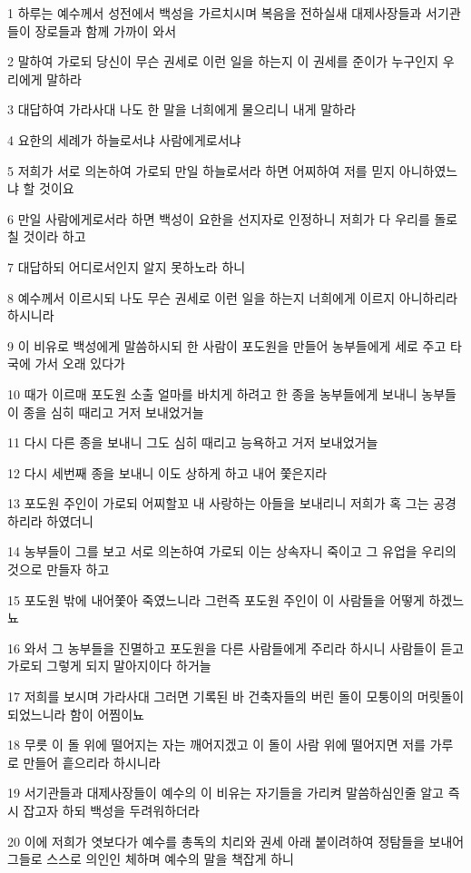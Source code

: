 \par 1 하루는 예수께서 성전에서 백성을 가르치시며 복음을 전하실새 대제사장들과 서기관들이 장로들과 함께 가까이 와서
\par 2 말하여 가로되 당신이 무슨 권세로 이런 일을 하는지 이 권세를 준이가 누구인지 우리에게 말하라
\par 3 대답하여 가라사대 나도 한 말을 너희에게 물으리니 내게 말하라
\par 4 요한의 세례가 하늘로서냐 사람에게로서냐
\par 5 저희가 서로 의논하여 가로되 만일 하늘로서라 하면 어찌하여 저를 믿지 아니하였느냐 할 것이요
\par 6 만일 사람에게로서라 하면 백성이 요한을 선지자로 인정하니 저희가 다 우리를 돌로 칠 것이라 하고
\par 7 대답하되 어디로서인지 알지 못하노라 하니
\par 8 예수께서 이르시되 나도 무슨 권세로 이런 일을 하는지 너희에게 이르지 아니하리라 하시니라
\par 9 이 비유로 백성에게 말씀하시되 한 사람이 포도원을 만들어 농부들에게 세로 주고 타국에 가서 오래 있다가
\par 10 때가 이르매 포도원 소출 얼마를 바치게 하려고 한 종을 농부들에게 보내니 농부들이 종을 심히 때리고 거저 보내었거늘
\par 11 다시 다른 종을 보내니 그도 심히 때리고 능욕하고 거저 보내었거늘
\par 12 다시 세번째 종을 보내니 이도 상하게 하고 내어 쫓은지라
\par 13 포도원 주인이 가로되 어찌할꼬 내 사랑하는 아들을 보내리니 저희가 혹 그는 공경하리라 하였더니
\par 14 농부들이 그를 보고 서로 의논하여 가로되 이는 상속자니 죽이고 그 유업을 우리의 것으로 만들자 하고
\par 15 포도원 밖에 내어쫓아 죽였느니라 그런즉 포도원 주인이 이 사람들을 어떻게 하겠느뇨
\par 16 와서 그 농부들을 진멸하고 포도원을 다른 사람들에게 주리라 하시니 사람들이 듣고 가로되 그렇게 되지 말아지이다 하거늘
\par 17 저희를 보시며 가라사대 그러면 기록된 바 건축자들의 버린 돌이 모퉁이의 머릿돌이 되었느니라 함이 어찜이뇨
\par 18 무릇 이 돌 위에 떨어지는 자는 깨어지겠고 이 돌이 사람 위에 떨어지면 저를 가루로 만들어 흩으리라 하시니라
\par 19 서기관들과 대제사장들이 예수의 이 비유는 자기들을 가리켜 말씀하심인줄 알고 즉시 잡고자 하되 백성을 두려워하더라
\par 20 이에 저희가 엿보다가 예수를 총독의 치리와 권세 아래 붙이려하여 정탐들을 보내어 그들로 스스로 의인인 체하며 예수의 말을 책잡게 하니
